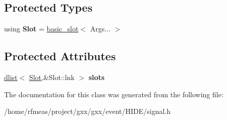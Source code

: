 \subsection*{Protected Types}
\begin{DoxyCompactItemize}
\item 
using {\bfseries Slot} = \hyperlink{classgxx_1_1basic__slot}{basic\+\_\+slot}$<$ Args... $>$\hypertarget{classgxx_1_1signal_a49f1611eff96431ec4396ebd39e719e2}{}\label{classgxx_1_1signal_a49f1611eff96431ec4396ebd39e719e2}

\end{DoxyCompactItemize}
\subsection*{Protected Attributes}
\begin{DoxyCompactItemize}
\item 
\hyperlink{classgxx_1_1dlist}{dlist}$<$ \hyperlink{classgxx_1_1basic__slot}{Slot},\&Slot\+::lnk $>$ {\bfseries slots}\hypertarget{classgxx_1_1signal_a240b508d3361e4222573ca016c81fd14}{}\label{classgxx_1_1signal_a240b508d3361e4222573ca016c81fd14}

\end{DoxyCompactItemize}


The documentation for this class was generated from the following file\+:\begin{DoxyCompactItemize}
\item 
/home/rfmeas/project/gxx/gxx/event/\+H\+I\+D\+E/signal.\+h\end{DoxyCompactItemize}
